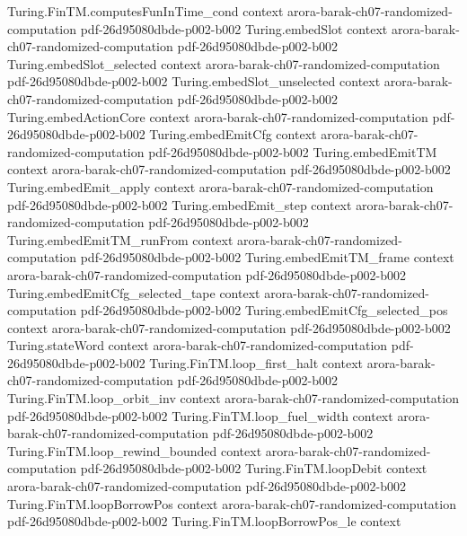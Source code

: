 \begin{theorem}
  {Turing.FinTM.computesFunInTime_cond}
  {context}
  {arora-barak-ch07-randomized-computation}
  {pdf-26d95080dbde-p002-b002}
\proofstep
  {Turing.embedSlot}
  {context}
  {arora-barak-ch07-randomized-computation}
  {pdf-26d95080dbde-p002-b002}
\proofstep
  {Turing.embedSlot_selected}
  {context}
  {arora-barak-ch07-randomized-computation}
  {pdf-26d95080dbde-p002-b002}
\proofstep
  {Turing.embedSlot_unselected}
  {context}
  {arora-barak-ch07-randomized-computation}
  {pdf-26d95080dbde-p002-b002}
\proofstep
  {Turing.embedActionCore}
  {context}
  {arora-barak-ch07-randomized-computation}
  {pdf-26d95080dbde-p002-b002}
\proofstep
  {Turing.embedEmitCfg}
  {context}
  {arora-barak-ch07-randomized-computation}
  {pdf-26d95080dbde-p002-b002}
\proofstep
  {Turing.embedEmitTM}
  {context}
  {arora-barak-ch07-randomized-computation}
  {pdf-26d95080dbde-p002-b002}
\proofstep
  {Turing.embedEmit_apply}
  {context}
  {arora-barak-ch07-randomized-computation}
  {pdf-26d95080dbde-p002-b002}
\proofstep
  {Turing.embedEmit_step}
  {context}
  {arora-barak-ch07-randomized-computation}
  {pdf-26d95080dbde-p002-b002}
\proofstep
  {Turing.embedEmitTM_runFrom}
  {context}
  {arora-barak-ch07-randomized-computation}
  {pdf-26d95080dbde-p002-b002}
\proofstep
  {Turing.embedEmitTM_frame}
  {context}
  {arora-barak-ch07-randomized-computation}
  {pdf-26d95080dbde-p002-b002}
\proofstep
  {Turing.embedEmitCfg_selected_tape}
  {context}
  {arora-barak-ch07-randomized-computation}
  {pdf-26d95080dbde-p002-b002}
\proofstep
  {Turing.embedEmitCfg_selected_pos}
  {context}
  {arora-barak-ch07-randomized-computation}
  {pdf-26d95080dbde-p002-b002}
\proofstep
  {Turing.stateWord}
  {context}
  {arora-barak-ch07-randomized-computation}
  {pdf-26d95080dbde-p002-b002}
\proofstep
  {Turing.FinTM.loop_first_halt}
  {context}
  {arora-barak-ch07-randomized-computation}
  {pdf-26d95080dbde-p002-b002}
\proofstep
  {Turing.FinTM.loop_orbit_inv}
  {context}
  {arora-barak-ch07-randomized-computation}
  {pdf-26d95080dbde-p002-b002}
\proofstep
  {Turing.FinTM.loop_fuel_width}
  {context}
  {arora-barak-ch07-randomized-computation}
  {pdf-26d95080dbde-p002-b002}
\proofstep
  {Turing.FinTM.loop_rewind_bounded}
  {context}
  {arora-barak-ch07-randomized-computation}
  {pdf-26d95080dbde-p002-b002}
\proofstep
  {Turing.FinTM.loopDebit}
  {context}
  {arora-barak-ch07-randomized-computation}
  {pdf-26d95080dbde-p002-b002}
\proofstep
  {Turing.FinTM.loopBorrowPos}
  {context}
  {arora-barak-ch07-randomized-computation}
  {pdf-26d95080dbde-p002-b002}
\proofstep
  {Turing.FinTM.loopBorrowPos_le}
  {context}

\end{theorem}
